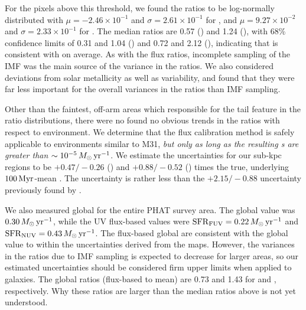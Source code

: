 \documentclass[iop, tighten]{emulateapj}
\begin{document}
For the pixels above this threshold, we found the \sfr{} ratios to be
log-normally distributed with $\mu = -2.46\times 10^{-1}$ and $\sigma =
2.61\times 10^{-1}$ for \fuv{}, and $\mu = 9.27\times 10^{-2}$ and $\sigma =
2.33\times 10^{-1}$ for \nuv{}. The median ratios are 0.57 (\fuv{}) and 1.24
(\nuv{}), with 68\% confidence limits of 0.31 and 1.04 (\fuv{}) and 0.72 and
2.12 (\nuv{}), indicating that \sfrx{} is consistent with \sfroneh{} on
average. As with the flux ratios, incomplete sampling of the IMF was the main
source of the variance in the \sfr{} ratios. We also considered deviations from
solar metallicity as well as \sfh{} variability, and found that they were far
less important for the overall variances in the \sfr{} ratios than IMF
sampling.

Other than the faintest, off-arm areas which responsible for the tail feature
in the \sfr{} ratio distributions, there were no found no obvious trends in the
\sfr{} ratios with respect to environment. We determine that the flux
calibration method is safely applicable to environments similar to M31,
\emph{but only as long as the resulting \sfr{}s are greater than $\sim
10^{-5}\,M_\odot\,\mathrm{yr}^{-1}$}. We estimate the \sfr{} uncertainties for our sub-kpc
regions to be $+\!0.47/\!-\!0.26$ (\fuv{}) and $+\!0.88/\!-\!0.52$ (\nuv{})
times the true, underlying $100\,\mathrm{Myr}$-mean \sfr{}. The \sfrfuv{} uncertainty is
rather less than the $+\!2.15/\!-\!0.88$ uncertainty previously found by
\citet{Simones:2014}.

We also measured global  for the entire PHAT survey area. The global
\sfroneh{} value was $0.30\,M_\odot\,\mathrm{yr}^{-1}$, while the UV flux-based values were
$\mathrm{SFR}_{\mathrm{FUV}} = 0.22\,M_\odot\,\mathrm{yr}^{-1}$ and $\mathrm{SFR}_{\mathrm{NUV}} = 0.43\,M_\odot\,\mathrm{yr}^{-1}$. The flux-based
global  are consistent with the global \sfroneh{} value to within the
uncertainties derived from the \sfr{} maps. However, the variances in the
\sfr{} ratios due to IMF sampling is expected to decrease for larger areas, so
our estimated uncertainties should be considered firm upper limits when applied
to galaxies. The global \sfr{} ratios (flux-based to mean) are 0.73 and 1.43
for \fuv{} and \nuv{}, respectively. Why these ratios are larger than the
median ratios above is not yet understood.
\end{document}
